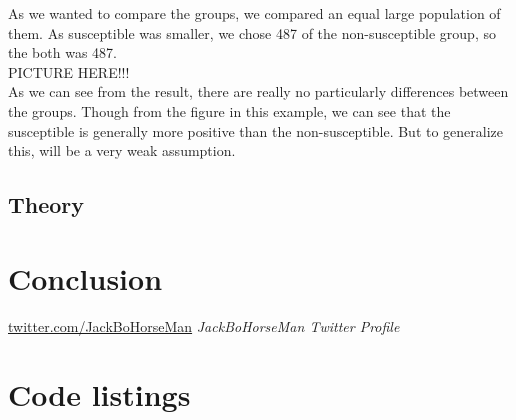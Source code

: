 \documentclass[10pt]{IEEEtran}
\begin{document}
As we wanted to compare the groups, we compared an equal large population of them. As susceptible was smaller, we chose 487 of the non-susceptible group, so the both was 487.  \\

PICTURE HERE!!!\\

As we can see from the result, there are really no particularly differences between the groups. Though from the figure in this example, we can see that the susceptible is generally more positive than the non-susceptible. But to generalize this, will be a very weak assumption. 

\subsection{Theory}

\section{Conclusion}





\begin{thebibliography}{9}

\url{twitter.com/JackBoHorseMan}
\textit{JackBoHorseMan Twitter Profile}

\end{thebibliography}

\clearpage
\onecolumn
\appendices
\section{Code listings}

\lstlistoflistings
\end{document}
